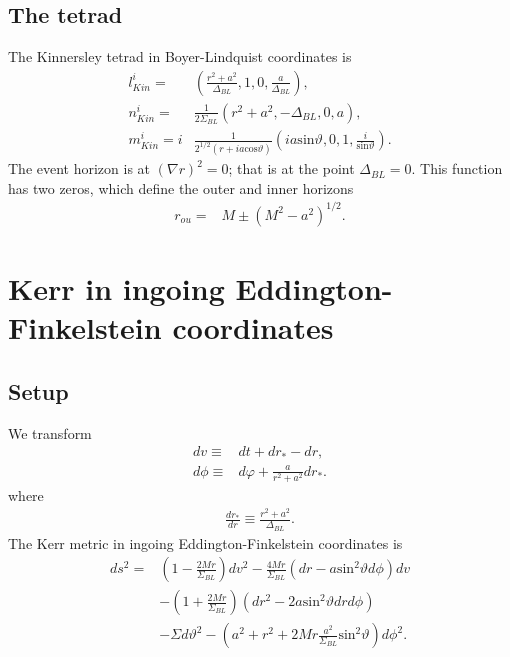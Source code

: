 \documentclass[12pt]{report}
\begin{document}
\subsection{The tetrad}
	The Kinnersley tetrad in Boyer-Lindquist coordinates is
\begin{subequations}
\label{eq:Kinnersley_tetrad_BL}
\begin{align}
	l_{Kin}^{i}
	= &
	\left(\frac{r^2+a^2}{\Delta_{BL}},1,0,\frac{a}{\Delta_{BL}}\right)
	, \\
	n_{Kin}^{i}
	= &
	\frac{1}{2\Sigma_{BL}}\left(r^2+a^2,-\Delta_{BL},0,a\right)
	, \\
	m_{Kin}^{i}
	= i&
	\frac{1}{2^{1/2}\left(r+ia\mathrm{cos}\vartheta\right)}
	\left(
		ia\mathrm{sin}\vartheta,0,1,\frac{i}{\mathrm{sin}\vartheta}
	\right)
	.
\end{align}
\end{subequations}
	The event horizon is at $(\nabla r)^2=0$;
that is at the point $\Delta_{BL}=0$. This function has two zeros, which
define the outer and inner horizons
\begin{subequations}
\begin{align}
	r_{ou} 
	= & 
	M \pm \left(M^2-a^2\right)^{1/2}
	.
\end{align}
\end{subequations}
\section{Kerr in ingoing Eddington-Finkelstein coordinates}
\subsection{Setup}
	We transform
\begin{subequations}
\begin{align}
	dv 
	\equiv & 
	dt + dr_* - dr 
	, \\
	d\phi 
	\equiv & 
	d\varphi + \frac{a}{r^2+a^2}dr_*
	.
\end{align}
\end{subequations}
	where
\begin{align}
	\frac{dr_*}{dr} 
	\equiv
	\frac{r^2+a^2}{\Delta_{BL}}
	.
\end{align}
	The Kerr metric in ingoing Eddington-Finkelstein coordinates is
\begin{align}
	ds^2
	= &
	\left(1-\frac{2Mr}{\Sigma_{BL}}\right)dv^2
-	\frac{4Mr}{\Sigma_{BL}}\left(
		dr
	-	a\mathrm{sin}^2\vartheta d\phi
	\right)
	dv
	\nonumber \\ &
-	\left(1+\frac{2Mr}{\Sigma_{BL}}\right)
	\left(
		dr^2
	-	2a\mathrm{sin}^2\vartheta drd\phi
	\right)
	\nonumber \\ &
-	\Sigma d\vartheta^2
-	\left(
		a^2+r^2+2Mr\frac{a^2}{\Sigma_{BL}}\mathrm{sin}^2\vartheta
	\right)
	d\phi^2
	.
\end{align}
\end{document}
